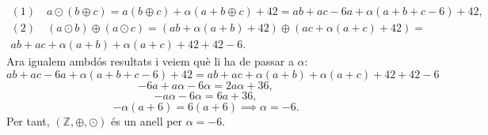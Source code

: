 \documentclass[11pt]{article}
\begin{document}
\begin{legal}
\begin{legal}
		\[
		\begin{array}{lcl}
			(1)\quad a\odot(b\oplus c)=a(b\oplus c)+\alpha(a+b\oplus c)+42=ab+ac-6a+\alpha(a+b+c-6)+42,\\
			(2)\quad (a\odot b)\oplus(a\odot c)=(ab+\alpha(a+b)+42)\oplus(ac+\alpha(a+c)+42)=\\
			ab+ac+\alpha(a+b)+\alpha(a+c)+42+42-6.
		\end{array}
		\]
		Ara igualem ambdós resultats i veiem què li ha de passar a $\alpha$:
		$$
		ab+ac-6a+\alpha(a+b+c-6)+42=ab+ac+\alpha(a+b)+\alpha(a+c)+42+42-6
		$$
		$$
		-6a+a\alpha-6\alpha=2a\alpha+36,
		$$
		$$
		-a\alpha-6\alpha=6a+36,
		$$
		$$
		-\alpha(a+6)=6(a+6)\implies \alpha=-6.
		$$
		Per tant, $(\mathbb{Z},\oplus,\odot)$ és un anell per $\alpha=-6$.
	\end{legal}
\end{legal}
\end{document}
